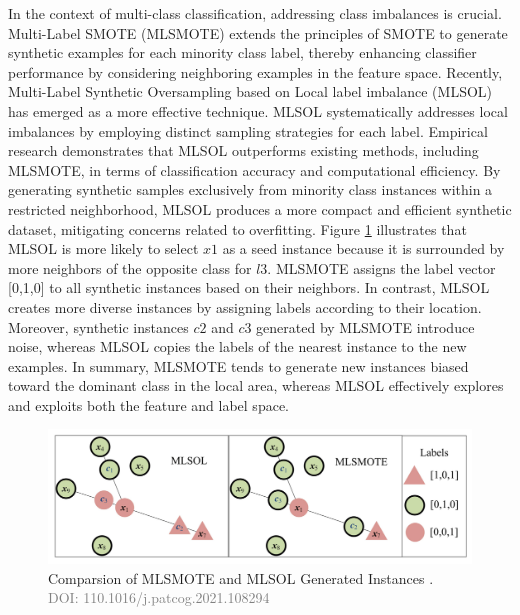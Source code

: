In the context of multi-class classification, addressing class imbalances is crucial. Multi-Label SMOTE \cite{charte2015mlsmote} (MLSMOTE) extends the principles of SMOTE to generate synthetic examples for each minority class label, thereby enhancing classifier performance by considering neighboring examples in the feature space. Recently, Multi-Label Synthetic Oversampling based on Local label imbalance \cite{liu2022multi} (MLSOL) has emerged as a more effective technique. MLSOL systematically addresses local imbalances by employing distinct sampling strategies for each label. Empirical research demonstrates that MLSOL outperforms existing methods, including MLSMOTE, in terms of classification accuracy and computational efficiency. By generating synthetic samples exclusively from minority class instances within a restricted neighborhood, MLSOL produces a more compact and efficient synthetic dataset, mitigating concerns related to overfitting.
Figure \ref{fig:mlsmote_mlsol} illustrates that MLSOL is more likely to select $x1$ as a seed instance because it is surrounded by more neighbors of the opposite class for $l3$. MLSMOTE assigns the label vector [0,1,0] to all synthetic instances based on their neighbors. In contrast, MLSOL creates more diverse instances by assigning labels according to their location. Moreover, synthetic instances $c2$ and $c3$ generated by MLSMOTE introduce noise, whereas MLSOL copies the labels of the nearest instance to the new examples. In summary, MLSMOTE tends to generate new instances biased toward the dominant class in the local area, whereas MLSOL effectively explores and exploits both the feature and label space.
\begin{figure}[!ht]

    \begin{center}
      \includegraphics[width=1\textwidth]{3_State-of-the-art/fig/mlsmote_mlsol.png}
    \end{center}

    \caption{Comparsion of MLSMOTE and MLSOL Generated Instances \cite{liu2022multi}.\\ \textcolor{gray}{\fontsize{10}{0}\selectfont DOI: 110.1016/j.patcog.2021.108294}}
    \label{fig:mlsmote_mlsol}

    \end{figure}
    

